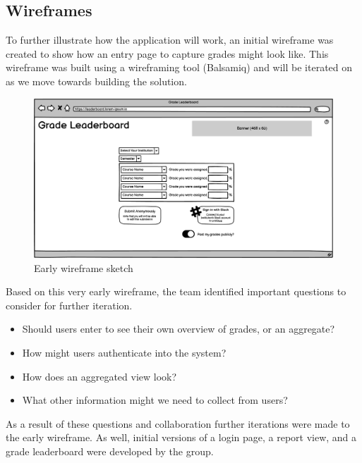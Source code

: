 \subsection{Wireframes}
To further illustrate how the application will work, an initial wireframe was created to show how an entry page to capture grades might look like. This wireframe was built using a wireframing tool (Balsamiq) and will be iterated on as we move towards building the solution.

\begin{figure}
    \centering
    \includegraphics[width=\textwidth]{images/Initial Page.png}
    \caption{Early wireframe sketch}
    \label{fig:earlywireframe}
\end{figure}

Based on this very early wireframe, the team identified important questions to consider for further iteration.

\begin{itemize}
    \item Should users enter to see their own overview of grades, or an aggregate?
    \item How might users authenticate into the system?
    \item How does an aggregated view look?
    \item What other information might we need to collect from users?
\end{itemize}

As a result of these questions and collaboration further iterations were made to the early wireframe. As well, initial versions of a login page, a report view, and a grade leaderboard were developed by the group.

